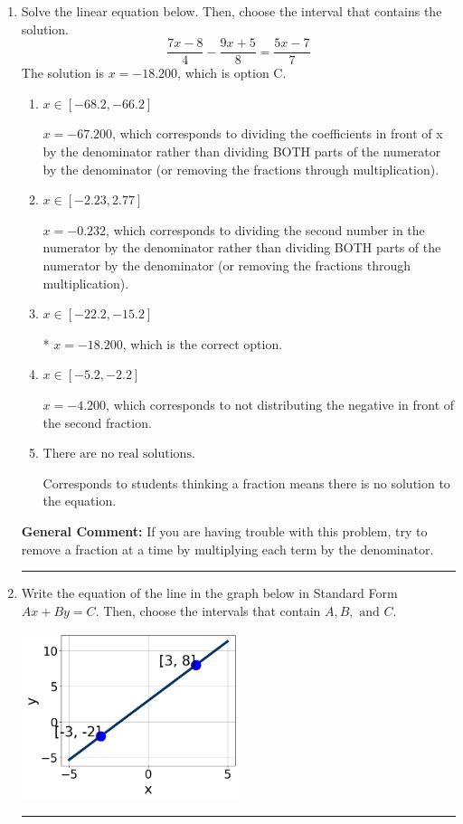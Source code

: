 \documentclass{extbook}[14pt]
\newcommand{\litem}[1]{\item #1

\rule{\textwidth}{0.4pt}}
\begin{document}
\begin{enumerate}\litem{
Solve the linear equation below. Then, choose the interval that contains the solution.
\[ \frac{7x -8}{4} - \frac{9x + 5}{8} = \frac{5x -7}{7} \]The solution is \( x = -18.200 \), which is option C.\begin{enumerate}[label=\Alph*.]
\item \( x \in [-68.2, -66.2] \)

 $x = -67.200$, which corresponds to dividing the coefficients in front of x by the denominator rather than dividing BOTH parts of the numerator by the denominator (or removing the fractions through multiplication).
\item \( x \in [-2.23, 2.77] \)

 $x = -0.232$, which corresponds to dividing the second number in the numerator by the denominator rather than dividing BOTH parts of the numerator by the denominator (or removing the fractions through multiplication).
\item \( x \in [-22.2, -15.2] \)

* $x = -18.200$, which is the correct option.
\item \( x \in [-5.2, -2.2] \)

 $x = -4.200$, which corresponds to not distributing the negative in front of the second fraction.
\item \( \text{There are no real solutions.} \)

Corresponds to students thinking a fraction means there is no solution to the equation.
\end{enumerate}

\textbf{General Comment:} If you are having trouble with this problem, try to remove a fraction at a time by multiplying each term by the denominator.
}
\litem{
Write the equation of the line in the graph below in Standard Form $Ax+By=C$. Then, choose the intervals that contain $A, B, \text{ and } C$.

\begin{center}
    \includegraphics[width=0.5\textwidth]{../Figures/linearGraphToStandardCopyA.png}
\end{center}


}
\end{enumerate}
\end{document}
